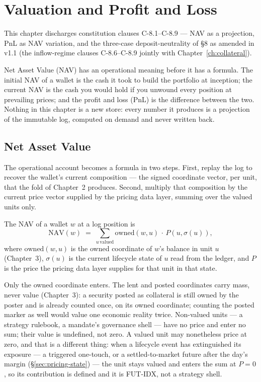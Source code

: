 \section{Valuation and Profit and Loss}\label{ch:valuation}

This chapter discharges constitution clauses C-8.1--C-8.9 --- NAV as a projection, PnL as NAV variation, and the three-case deposit-neutrality of \S8 as amended in v1.1 (the inflow-regime clauses C-8.6--C-8.9 jointly with Chapter~\ref{ch:collateral}).

Net Asset Value (NAV) has an operational meaning before it has a formula.
The initial NAV of a wallet is the cash it took to build the portfolio at
inception; the current NAV is the cash you would hold if you unwound every
position at prevailing prices; and the profit and loss (PnL) is the
difference between the two. Nothing in this chapter is a new store: every
number it produces is a projection of the immutable log, computed on demand
and never written back.

\subsection{Net Asset Value}

The operational account becomes a formula in two steps. First, replay the log
to recover the wallet's current composition --- the signed coordinate vector,
per unit, that the fold of Chapter~2 produces. Second, multiply that
composition by the current price vector supplied by the pricing data layer,
summing over the valued units only.

\begin{definition}
The NAV of a wallet $w$ at a log position is
\[
  \mathrm{NAV}(w) \;=\; \sum_{u \,\text{valued}} \mathrm{owned}(w,u)\,\cdot\, P\!\left(u, \sigma(u)\right),
\]
where $\mathrm{owned}(w,u)$ is the owned coordinate of $w$'s balance in unit
$u$ (Chapter~3), $\sigma(u)$ is the current lifecycle state of $u$ read from
the ledger, and $P$ is the price the pricing data layer supplies for that unit
in that state.
\end{definition}

Only the owned coordinate enters. The lent and posted coordinates carry mass,
never value (Chapter~3): a security posted as collateral is still owned by the
poster and is already counted once, on its owned coordinate; counting the
posted marker as well would value one economic reality twice. Non-valued units
--- a strategy rulebook, a mandate's governance shell --- have no price and
enter no sum; their value is undefined, not zero. A valued unit may nonetheless
price at zero, and that is a different thing: when a lifecycle event has
extinguished its exposure --- a triggered one-touch, or a settled-to-market
future after the day's margin (\S\ref{sec:pricing-state}) --- the unit stays
valued and enters the sum at $P=0$, so its contribution is defined and it is
FUT-IDX, not a strategy shell.

